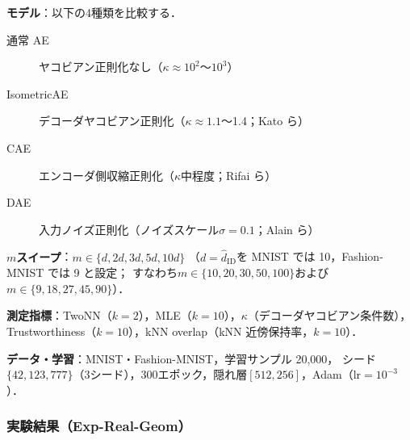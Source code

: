 \documentclass[11pt,a4paper]{jsarticle}
\newcommand{\kap}{\kappa}
\begin{document}
\textbf{モデル}：以下の4種類を比較する．
\begin{description}
  \item[通常 AE] ヤコビアン正則化なし（$\kap \approx 10^2$〜$10^3$）
  \item[IsometricAE] デコーダヤコビアン正則化（$\kap \approx 1.1$〜1.4；Kato ら\cite{kato2020rdae}）
  \item[CAE] エンコーダ側収縮正則化（$\kap$中程度；Rifai ら\cite{rifai2011cae}）
  \item[DAE] 入力ノイズ正則化（ノイズスケール$\sigma=0.1$；Alain ら\cite{alain2014dae}）
\end{description}

\textbf{$m$スイープ}：$m \in \{d, 2d, 3d, 5d, 10d\}$
（$d = \hat{d}_\mathrm{ID}$を MNIST では 10，Fashion-MNIST では 9 と設定；
すなわち$m \in \{10, 20, 30, 50, 100\}$および$m \in \{9, 18, 27, 45, 90\}$）．

\textbf{測定指標}：TwoNN（$k=2$），MLE（$k=10$），$\kap$（デコーダヤコビアン条件数），
Trustworthiness（$k=10$），kNN overlap（kNN 近傍保持率，$k=10$）．

\textbf{データ・学習}：MNIST・Fashion-MNIST，学習サンプル 20,000，
シード$\{42, 123, 777\}$（3シード），300エポック，隠れ層$[512, 256]$，Adam（lr$=10^{-3}$）．

\subsubsection*{実験結果（Exp-Real-Geom）}
\end{document}
